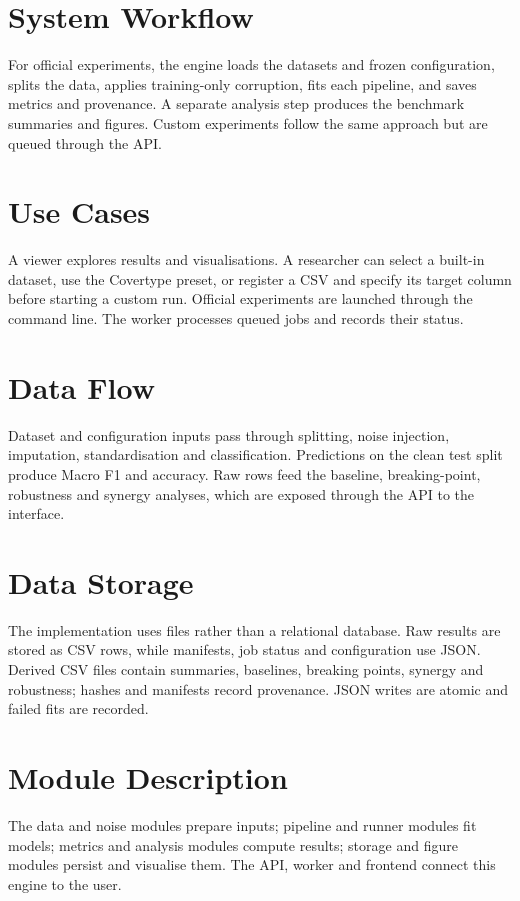 \section{System Workflow}
For official experiments, the engine loads the datasets and frozen configuration, splits the data, applies training-only corruption, fits each pipeline, and saves metrics and provenance. A separate analysis step produces the benchmark summaries and figures. Custom experiments follow the same approach but are queued through the API.
\section{Use Cases}
A viewer explores results and visualisations. A researcher can select a built-in dataset, use the Covertype preset, or register a CSV and specify its target column before starting a custom run. Official experiments are launched through the command line. The worker processes queued jobs and records their status.
\section{Data Flow}
Dataset and configuration inputs pass through splitting, noise injection, imputation, standardisation and classification. Predictions on the clean test split produce Macro F1 and accuracy. Raw rows feed the baseline, breaking-point, robustness and synergy analyses, which are exposed through the API to the interface.
\section{Data Storage}
The implementation uses files rather than a relational database. Raw results are stored as CSV rows, while manifests, job status and configuration use JSON. Derived CSV files contain summaries, baselines, breaking points, synergy and robustness; hashes and manifests record provenance. JSON writes are atomic and failed fits are recorded.
\section{Module Description}
The data and noise modules prepare inputs; pipeline and runner modules fit models; metrics and analysis modules compute results; storage and figure modules persist and visualise them. The API, worker and frontend connect this engine to the user.
